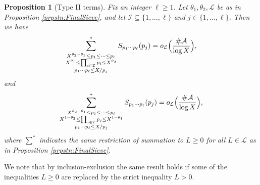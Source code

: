 \documentclass[10pt]{amsart}
\theoremstyle{plain}
\newtheorem{prpstn}[thrm]{Proposition}
\numberwithin{sblmm}{thrm}
\numberwithin{equation}{section}
\begin{document}
%
%
%
%
%
%
%
\begin{prpstn}[Type II terms] \label{prpstn:FinalTypeII}
%
Fix an integer $\ell\ge1$. Let $\theta_1,\theta_2,\mathcal{L}$ be as in Proposition \ref{prpstn:FinalSieve}, and let $\mathcal{I}\subseteq\{1,\dots,\ell\}$ and $j\in\{1,\dots,\ell\}$. Then we have
\[
\sum_{\substack{X^{\theta_2-\theta_1}\le p_1\le \dots\le p_\ell \\ X^{\theta_1}\le\prod_{i\in\mathcal{I}}p_i\le X^{\theta_2} \\ p_1\cdots p_\ell\le X/p_j }}^*S_{p_1\cdots p_\ell}(p_j)=o_{\mathcal{L}}\Bigl(\frac{\#\mathcal{A}}{\log{X}}\Bigr),
\]
and
\[
\sum_{\substack{X^{\theta_2-\theta_1}\le p_1\le \dots\le p_\ell \\ X^{1-\theta_2}\le\prod_{i\in\mathcal{I}}p_j\le X^{1-\theta_1} \\ p_1\cdots p_\ell \le X/p_j }}^*S_{p_1\cdots p_\ell}(p_j)=o_{\mathcal{L}}\Bigl(\frac{\#\mathcal{A}}{\log{X}}\Bigr),
\]
where $\sum^*$ indicates the same restriction of summation to $L\ge 0$ for all $L\in\mathcal{L}$ as in Proposition \ref{prpstn:FinalSieve}.
%
\end{prpstn}
%
%
%
%
We note that by inclusion-exclusion the same result holds if some of the inequalities $L\ge 0$ are replaced by the strict inequality $L>0$.
%
%
%
%
\end{document}
